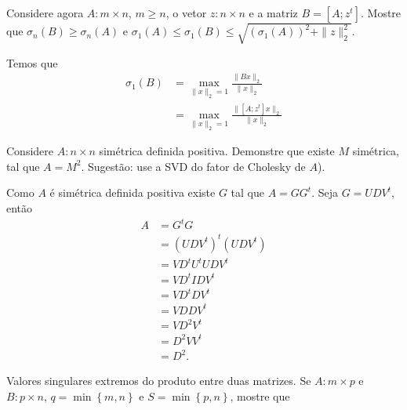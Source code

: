 \begin{questions}
    \question Considere agora $A : m \times n$, $m \geq n$, o vetor $z : n \times n$ e a matriz $B = [A; z^t]$. Mostre que $\sigma_n(B) \geq \sigma_n(A)$ e $\sigma_1(A) \leq \sigma_1(B) \leq \sqrt{\left( \sigma_1(A) \right)^2 + \| z \|_2^2}$.
    \begin{solution}
        Temos que
        \begin{align*}
            \sigma_1(B) &= \max_{\| x \|_2 = 1} \frac{\| B x \|_2}{\| x \|_2} \\
            &= \max_{\| x \|_2 = 1} \frac{\| [A; z^t] x \|_2}{\| x \|_2}
        \end{align*}
    \end{solution}

     Considere $A : n \times n$ sim\'{e}trica definida positiva. Demonstre que existe $M$ sim\'{e}trica, tal que $A = M^2$. Sugest\~{a}o: use a SVD do fator de Cholesky de $A$).
    \begin{solution}
        Como $A$ \'{e} sim\'{e}trica definida positiva existe $G$ tal que $A = G G^t$. Seja $G = U D V^t$, ent\~{a}o
        \begin{align*}
            A &= G^t G \\
            &= \left( U D V^t \right)^t \left( U D V^t \right) \\
            &= V D^t U^t U D V^t \\
            &= V D^t I D V^t \\
            &= V D^t D V^t \\
            &= V D D V^t \\
            &= V D^2 V^t \\
            &= D^2 V V^t \\
            &= D^2.
        \end{align*}
    \end{solution}

    \question Valores singulares extremos do produto entre duas matrizes. Se $A : m \times p$ e $B : p \times n$, $q = \min\left\{ m, n \right\}$ e $S = \min\left\{ p, n \right\}$, mostre que
\end{questions}

